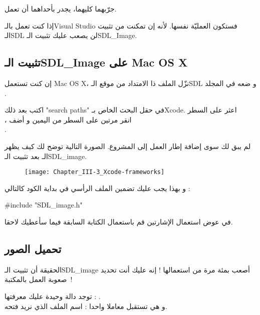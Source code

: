 جرّبهما كليهما، يجدر بأحداهما أن تعمل.

\begin{information}
إذا كنت تعمل بالـ\textenglish{Visual Studio}
فستكون العمليّة نفسها. لأنه إن تمكنت من تثبيت الـ\textenglish{SDL}
لن يصعب عليك تثبيت الـ\textenglish{SDL\_Image}.
\end{information}

\subsection{تثبيت الـ\textenglish{SDL\_Image} على \textenglish{Mac OS X}}


إن كنت تستعمل
\textenglish{Mac OS X}،
نزّل الملف ذا الامتداد
من موقع الـ\textenglish{SDL}
و ضعه في المجلد\\
.

اكتب بعد ذلك
"\textenglish{search paths}"
 في حقل البحث الخاص بـ\textenglish{Xcode}.
 اعثر على السطر\\
،
 انقر مرتين على السطر من اليمين و أضف\\
.

لم يبق لك سوى إضافة إطار العمل إلى المشروع. الصورة التالية توضح لك كيف يظهر\\
الـ
بعد تثبيت الـ\textenglish{SDL\_image}.

\begin{figure}[H]
	\centering
	\texttt{[image: Chapter\_III-3\_Xcode-frameworks]}
\end{figure}

و بهذا يجب عليك تضمين الملف الرأسي في بداية الكود كالتالي :
\begin{Csource}
#include "SDL_image.h"
\end{Csource}
في عوض استعمال الإشارتين
\InlineCode{< >}
 قم باستعمال الكتابة السابقة فيما سأعطيك لاحقا.

\subsection{تحميل الصور}

الحقيقة أن تثبيت الـ\textenglish{SDL\_image}
أصعب بمئة مرة من استعمالها ! إنه عليك أنت تحديد صعوبة العمل بالمكتبة~! 

توجد دالة وحيدة عليك معرفتها : 
.\\
و هي تستقبل معاملا واحدا : اسم الملف الذي نريد فتحه.


